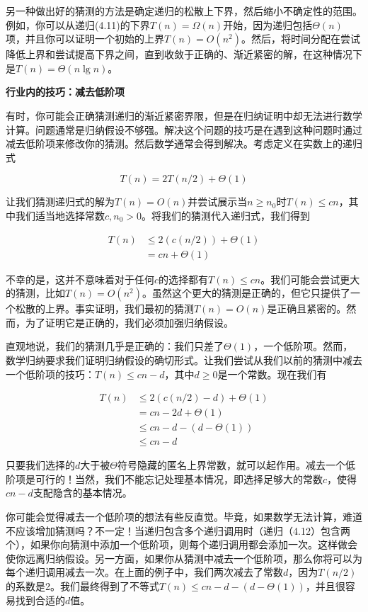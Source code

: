 \documentclass[lang=cn,newtx,10pt,scheme=chinese]{elegantbook}
\begin{document}
另一种做出好的猜测的方法是确定递归的松散上下界，然后缩小不确定性的范围。例如，你可以从递归(4.11)的下界$T(n)=\Omega(n)$开始，因为递归包括$\Theta(n)$项，并且你可以证明一个初始的上界$T(n)=O(n^2)$。然后，将时间分配在尝试降低上界和尝试提高下界之间，直到收敛于正确的、渐近紧密的解，在这种情况下是$T(n)=\Theta(n \lg n)$。

\textbf{行业内的技巧：减去低阶项}

有时，你可能会正确猜测递归的渐近紧密界限，但是在归纳证明中却无法进行数学计算。问题通常是归纳假设不够强。解决这个问题的技巧是在遇到这种问题时通过减去低阶项来修改你的猜测。然后数学通常会得到解决。考虑定义在实数上的递归式

\begin{equation}
T(n)=2 T(n / 2)+\Theta(1)
\end{equation}

让我们猜测递归式的解为$T(n)=O(n)$并尝试展示当$n \geq n_0$时$T(n) \leq c n$，其中我们适当地选择常数$c, n_0>0$。将我们的猜测代入递归式，我们得到

$$
\begin{aligned}
T(n) & \leq 2(c(n / 2))+\Theta(1) \\
& =c n+\Theta(1)
\end{aligned}
$$

不幸的是，这并不意味着对于任何$c$的选择都有$T(n) \leq c n$。我们可能会尝试更大的猜测，比如$T(n)=O(n^2)$。虽然这个更大的猜测是正确的，但它只提供了一个松散的上界。事实证明，我们最初的猜测$T(n)=O(n)$是正确且紧密的。然而，为了证明它是正确的，我们必须加强归纳假设。

直观地说，我们的猜测几乎是正确的：我们只差了$\Theta(1)$，一个低阶项。然而，数学归纳要求我们证明归纳假设的确切形式。让我们尝试从我们以前的猜测中减去一个低阶项的技巧：$T(n) \leq c n-d$，其中$d \geq 0$是一个常数。现在我们有

$$
\begin{aligned}
T(n) & \leq 2(c(n / 2)-d)+\Theta(1) \\
& =c n-2 d+\Theta(1) \\
& \leq c n-d-(d-\Theta(1)) \\
& \leq c n-d
\end{aligned}
$$

只要我们选择的$d$大于被$\Theta$符号隐藏的匿名上界常数，就可以起作用。减去一个低阶项是可行的！当然，我们不能忘记处理基本情况，即选择足够大的常数$c$，使得$c n-d$支配隐含的基本情况。

你可能会觉得减去一个低阶项的想法有些反直觉。毕竟，如果数学无法计算，难道不应该增加猜测吗？不一定！当递归包含多个递归调用时（递归（4.12）包含两个），如果你向猜测中添加一个低阶项，则每个递归调用都会添加一次。这样做会使你远离归纳假设。另一方面，如果你从猜测中减去一个低阶项，那么你将可以为每个递归调用减去一次。在上面的例子中，我们两次减去了常数$d$，因为$T(n/2)$的系数是2。我们最终得到了不等式$T(n) \leq c n-d-(d-\Theta(1))$，并且很容易找到合适的$d$值。
\end{document}
